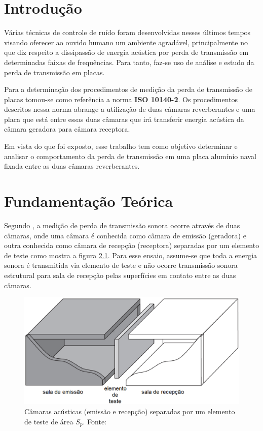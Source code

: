 \chapter{Introdução}\label{introducao}

Várias técnicas de controle de ruído foram desenvolvidas nesses últimos tempos visando oferecer ao ouvido humano um ambiente agradável, principalmente no que diz respeito a dissipassão de energia acústica por perda de transmissão em determinadas faixas de frequências. Para tanto, faz-se uso de análise e estudo da perda de transmissão em placas.

Para a determinação dos procedimentos de medição da perda de transmissão de placas tomou-se como referência a norma \textbf{ISO 10140-2}. Os procedimentos descritos nessa norma abrange a utilização de duas câmaras reverberantes e uma placa que está entre essas duas câmaras que irá transferir energia acústica da câmara geradora para câmara receptora.

Em vista do que foi exposto, esse trabalho tem como objetivo determinar e analisar o comportamento da perda de transmissão em uma placa alumínio naval fixada entre as duas câmaras reverberantes.

\chapter{Fundamentação Teórica}\label{fundamentacao}

Segundo \cite{lenzi2009modelos}, a medição de perda de transmissão sonora ocorre através de duas câmaras, onde uma câmara é conhecida como câmara de emissão (geradora) e outra conhecida como câmara de recepção (receptora) separadas por um elemento de teste como mostra a figura \ref{teoria_1}. Para esse ensaio, assume-se que toda a energia sonora é transmitida via elemento de teste e não ocorre transmissão sonora estrutural para sala de recepção pelas superfícies em contato entre as duas câmaras.

\begin{figure}[h]
	\centering
	\includegraphics[scale=0.5]{teoria_1.eps}
	\caption{Câmaras acústicas (emissão e recepção) separadas por um elemento de teste de
área $S_p$. Fonte: \cite{silva2009simulaccao}}
	\label{teoria_1}
\end{figure}

